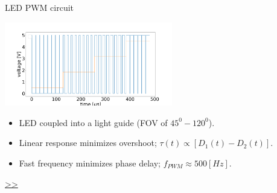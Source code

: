 \documentclass{beamer}
\begin{document}
\begin{frame}{\hypertarget{frame:LED PWM circuit}{LED PWM circuit}}

	\begin{center}		
		\includegraphics[width=0.55\textwidth,keepaspectratio]{duty_cycle.png}
	\end{center}
	\begin{itemize}		
		\item LED coupled into a light guide (FOV of $45^0-120^0$).
		\item Linear response minimizes overshoot; $\tau(t)  \propto [D_1(t) -D_2(t)] $.
		\item Fast frequency minimizes phase delay; $f_{PWM} \approx 500[Hz]$.
		
		
	\end{itemize}
	\hyperlink{frame:LED PWM circuit 1}{>>} 
\end{frame}
\end{document}
